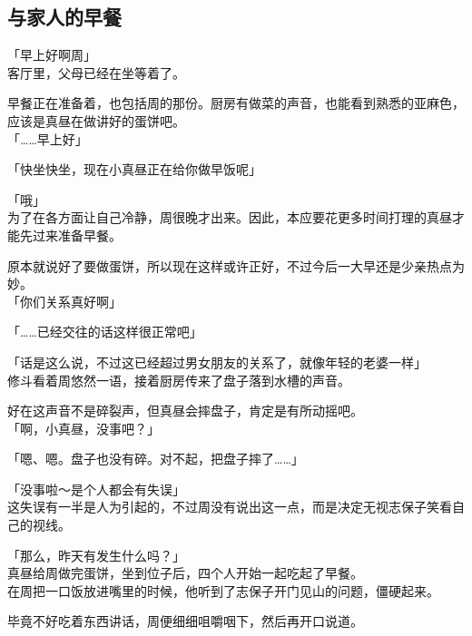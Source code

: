 \subsection{与家人的早餐}

「早上好啊周」\\

客厅里，父母已经在坐等着了。

早餐正在准备着，也包括周的那份。厨房有做菜的声音，也能看到熟悉的亚麻色，应该是真昼在做讲好的蛋饼吧。\\

「……早上好」

「快坐快坐，现在小真昼正在给你做早饭呢」

「哦」\\

为了在各方面让自己冷静，周很晚才出来。因此，本应要花更多时间打理的真昼才能先过来准备早餐。

原本就说好了要做蛋饼，所以现在这样或许正好，不过今后一大早还是少亲热点为妙。\\

「你们关系真好啊」

「……已经交往的话这样很正常吧」

「话是这么说，不过这已经超过男女朋友的关系了，就像年轻的老婆一样」\\

修斗看着周悠然一语，接着厨房传来了盘子落到水槽的声音。

好在这声音不是碎裂声，但真昼会摔盘子，肯定是有所动摇吧。\\

「啊，小真昼，没事吧？」

「嗯、嗯。盘子也没有碎。对不起，把盘子摔了……」

「没事啦～是个人都会有失误」\\

这失误有一半是人为引起的，不过周没有说出这一点，而是决定无视志保子笑看自己的视线。\\

\vspace{2\baselineskip}

「那么，昨天有发生什么吗？」\\

真昼给周做完蛋饼，坐到位子后，四个人开始一起吃起了早餐。\\

在周把一口饭放进嘴里的时候，他听到了志保子开门见山的问题，僵硬起来。

毕竟不好吃着东西讲话，周便细细咀嚼咽下，然后再开口说道。\\

